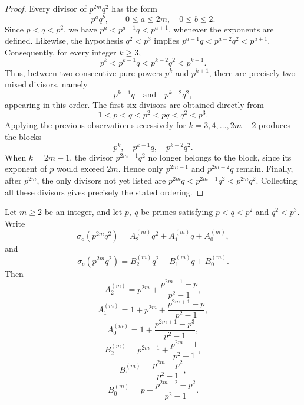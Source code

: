 \documentclass[12pt,reqno]{article}
\begin{document}
\begin{proof}
Every divisor of \(p^{2m}q^2\) has the form
\[
p^aq^b,
\qquad
0\le a\le 2m,\quad 0\le b\le2.
\]
Since
$p<q<p^2$,
we have
$p^a<p^{a-1}q<p^{a+1}$,
whenever the exponents are defined. Likewise, the hypothesis
$
q^2<p^3
$
implies
$p^{a-1}q<p^{a-2}q^2<p^{a+1}$.
Consequently, for every integer \(k\ge3\),
\[
p^k
<
p^{k-1}q
<
p^{k-2}q^2
<
p^{k+1}.
\]
Thus, between two consecutive pure powers \(p^k\) and \(p^{k+1}\), there are
precisely two mixed divisors, namely
\[
p^{k-1}q
\quad\text{and}\quad
p^{k-2}q^2,
\]
appearing in this order.
The first six divisors are obtained directly from
\[
1<p<q<p^2<pq<q^2<p^3.
\]
Applying the previous observation successively for
$
k=3,4,\ldots,2m-2
$
produces the blocks
\[
p^k,\quad
p^{k-1}q,\quad
p^{k-2}q^2.
\]
When \(k=2m-1\), the divisor \(p^{2m-1}q^2\) no longer belongs to the block,
since its exponent of \(p\) would exceed \(2m\). Hence only
$p^{2m-1}$ and $p^{2m-2}q$
remain. Finally, after \(p^{2m}\), the only divisors not yet listed are $p^{2m}q<p^{2m-1}q^2<p^{2m}q^2$.
Collecting all these divisors gives precisely the stated ordering.
\end{proof}

\begin{lemma}\label{lem:closedcoeff}
Let \(m\ge2\) be an integer, and let \(p,\ q\) be primes satisfying $p<q<p^2$ and $q^2<p^3$.
Write
\[
\sigma_o(p^{2m}q^2)=A_2^{(m)}q^2+A_1^{(m)}q+A_0^{(m)},
\]
and
\[
\sigma_e(p^{2m}q^2)=B_2^{(m)}q^2+B_1^{(m)}q+B_0^{(m)}.
\]
Then
\begin{equation}\label{E8}
A_2^{(m)}
=
p^{2m}
+
\frac{p^{2m-1}-p}{p^2-1},
\end{equation}
\begin{equation}\label{E9}
A_1^{(m)}
=
1+p^{2m}
+
\frac{p^{2m+1}-p}{p^2-1},
\end{equation}
\begin{equation}\label{E10}
A_0^{(m)}
=
1+
\frac{p^{2m+1}-p^3}{p^2-1},
\end{equation}
\begin{equation}\label{E11}
B_2^{(m)}
=
p^{2m-1}
+
\frac{p^{2m}-1}{p^2-1},
\end{equation}
\begin{equation}\label{E12}
B_1^{(m)}
=
\frac{p^{2m}-p^2}{p^2-1},
\end{equation}
\begin{equation}\label{E13}
B_0^{(m)}
=
p+
\frac{p^{2m+2}-p^2}{p^2-1}.
\end{equation}
\end{lemma}
\end{document}
